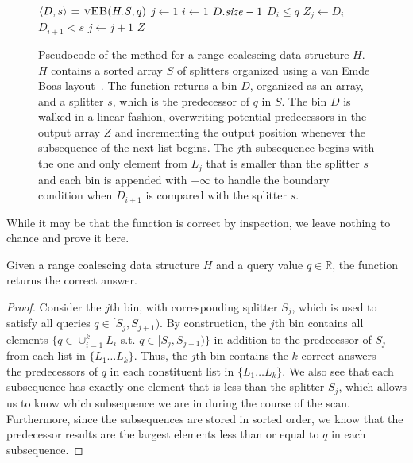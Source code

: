 \begin{figure}[t] 
  \begin{codebox*}
    \li $\langle D, s \rangle \gets \proc{vEB}(\attrib{H}{S},q)$ 
    \li $j \gets 1$
    \li \For $i \gets 1$ \To $\attrib{D}{\id{size}} - 1$ \Do
    \li   \If $D_i \leq q$ \Do
    \li     $Z_j \gets D_i$
          \End
    \li   \If $D_{i+1} < s$ \Do
    \li     $j \gets j + 1$
          \End
        \End
    \li \Return $Z$
  \end{codebox*}
\caption{Pseudocode of the  method for a range coalescing data
structure $H$.  $H$ contains a sorted array $S$ of splitters organized using
a van Emde Boas layout~\cite{BenderDeFa00}.  The function  returns 
a bin $D$, organized as an array, and a splitter $s$, which is the predecessor 
of $q$ in $S$.  The bin $D$ is walked in a linear fashion, overwriting potential
predecessors in the output array $Z$ and incrementing the output position whenever
the subsequence of the next list begins.  The $j$th subsequence begins with the
one and only element from $L_j$ that is smaller than the splitter $s$ and each
bin is appended with $-\infty$ to handle the boundary condition when $D_{i+1}$ is
compared with the splitter $s$. }
\label{fig:query} 
\end{figure}

While it may be that the function  is correct by inspection, we leave
nothing to chance and prove it here.

\begin{lemma}
Given a range coalescing data structure
$H$ and a query value $q \in \mathbb{R}$, the function  
returns the correct answer.
\end{lemma}
\begin{proof}
Consider the $j$th bin, with corresponding splitter $S_j$, which is used to satisfy
all queries $q \in [S_j, S_{j+1})$.  By construction, the $j$th bin contains all
elements $\{q \in \cup_{i=1}^{k} L_i$ s.t. $q \in [S_j, S_{j+1}) \}$ in addition to 
the predecessor of $S_j$ from each list in $\{ L_1 \ldots L_k \}$.  
Thus, the $j$th bin contains the $k$ correct
answers --- the predecessors of $q$ in each constituent list in $\{ L_1 \ldots L_k \}$.  
We also see that each subsequence has exactly one element that is less
than the splitter $S_j$, which allows us to know which subsequence we are in during
the course of the scan.  Furthermore, since the subsequences are stored in sorted
order, we know that the predecessor results are the largest elements less than or
equal to $q$ in each subsequence.
\end{proof}

